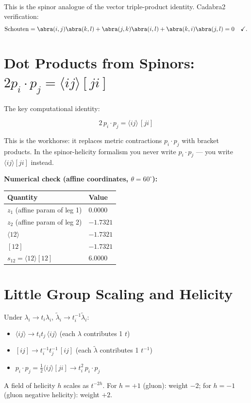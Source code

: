 \documentclass[12pt]{article}
\begin{document}
This is the spinor analogue of the vector triple-product identity.
Cadabra2 verification:
\begin{equation}
\mathrm{Schouten} = \abra(i , j) \abra(k , l) + \abra(j , k) \abra(i , l) + \abra(k , i) \abra(j , l) = 0 \quad\checkmark .
\end{equation}

\section{Dot Products from Spinors:
$2p_i\cdot p_j = \langle ij\rangle[ji]$}\label{sec:dot_products}

The key computational identity:

\begin{mdframed}[backgroundcolor=green!5]
\begin{equation}
\boxed{2\,p_i\cdot p_j = \langle ij\rangle\,[ji]}
\tag{48.17}
\end{equation}
\end{mdframed}

This is the workhorse: it replaces metric contractions $p_i\cdot p_j$ with
bracket products.  In the spinor-helicity formalism you never write
$p_i\cdot p_j$ --- you write $\langle ij\rangle[ji]$ instead.

\textbf{Numerical check (affine coordinates, $\theta=60^\circ$):}
\begin{center}
\begin{tabular}{|l|l|}
\hline
Quantity & Value \\
\hline
$z_1$ (affine param of leg 1) & $0.0000$ \\
$z_2$ (affine param of leg 2) & $-1.7321$ \\
$\langle 12\rangle$ & $-1.7321$ \\
$[12]$ & $-1.7321$ \\
$s_{12}=\langle12\rangle[12]$ & $6.0000$ \\
\hline
\end{tabular}
\end{center}

\section{Little Group Scaling and Helicity}\label{sec:helicity}

Under $\lambda_i\to t_i\lambda_i$, $\tilde\lambda_i\to t_i^{-1}\tilde\lambda_i$:
\begin{itemize}
\item $\langle ij\rangle\to t_i t_j\,\langle ij\rangle$ (each $\lambda$ contributes 1 $t$)
\item $[ij]\to t_i^{-1}t_j^{-1}\,[ij]$ (each $\tilde\lambda$ contributes 1 $t^{-1}$)
\item $p_i\cdot p_j = \tfrac12\langle ij\rangle[ji]\to t_i^2\,p_i\cdot p_j$
\end{itemize}
A field of helicity $h$ scales as $t^{-2h}$.  For $h=+1$ (gluon): weight $-2$;
for $h=-1$ (gluon negative helicity): weight $+2$.
\end{document}
